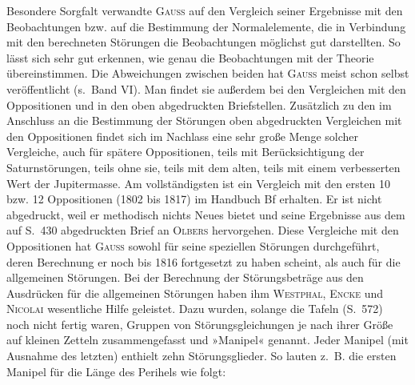 \par\noindent\hspace*{\parindent}Besondere Sorgfalt verwandte \textsc{Gauss} auf den Vergleich seiner Ergebnisse mit den Beobachtungen
bzw. auf die Bestimmung der Normalelemente, die in Verbindung mit den berechneten Störungen die
Beobachtungen möglichst gut darstellten. So lässt sich sehr gut erkennen,
wie genau die Beobachtungen mit der Theorie übereinstimmen. Die Abweichungen zwischen beiden
hat \textsc{Gauss} meist schon selbst veröffentlicht (s.~Band VI). Man findet sie außerdem bei den Vergleichen
mit den Oppositionen und in den oben abgedruckten Briefstellen. Zusätzlich zu den im Anschluss an die Bestimmung
der Störungen oben abgedruckten Vergleichen mit den Oppositionen findet sich im Nachlass
eine sehr große Menge solcher Vergleiche, auch für spätere Oppositionen, teils mit Berücksichtigung
der Saturnstörungen, teils ohne sie, teils mit dem alten, teils mit einem verbesserten Wert der Jupitermasse.
Am vollständigsten ist ein Vergleich mit den ersten 10 bzw. 12 Oppositionen (1802 bis 1817) im Handbuch
Bf erhalten. Er ist nicht abgedruckt, weil er methodisch nichts Neues bietet und seine
Ergebnisse aus dem auf S.~430 abgedruckten Brief an \textsc{Olbers} hervorgehen. Diese Vergleiche mit den Oppositionen
hat \textsc{Gauss} sowohl für seine speziellen Störungen durchgeführt, deren Berechnung er noch bis 1816
fortgesetzt zu haben scheint, als auch für die allgemeinen Störungen. Bei der Berechnung der Störungsbeträge aus
den Ausdrücken für die allgemeinen Störungen haben ihm \textsc{Westphal}, \textsc{Encke} und \textsc{Nicolai} wesentliche
Hilfe geleistet. Dazu wurden, solange die Tafeln (S.~572) noch nicht fertig waren, Gruppen von Störungsgleichungen
je nach ihrer Größe auf kleinen Zetteln zusammengefasst und »Manipel« genannt. Jeder Manipel
(mit Ausnahme des letzten) enthielt zehn Störungsglieder. So lauten z.~B. die ersten Manipel für die
Länge des Perihels wie folgt:


